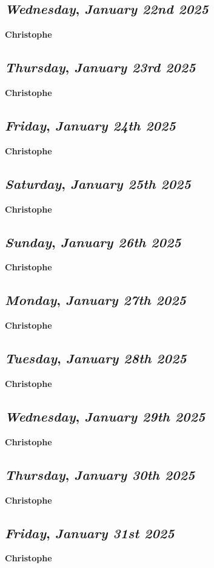 \def\day{\textit{January 22nd 2025}}
\def\weekday{\textit{Wednesday}}
\subsection*{\weekday, \day}
\textbf {Christophe}

\def\day{\textit{January 23rd 2025}}
\def\weekday{\textit{Thursday}}
\subsection*{\weekday, \day}
\textbf {Christophe}

\def\day{\textit{January 24th 2025}}
\def\weekday{\textit{Friday}}
\subsection*{\weekday, \day}
\textbf {Christophe}

\def\day{\textit{January 25th 2025}}
\def\weekday{\textit{Saturday}}
\subsection*{\weekday, \day}
\textbf {Christophe}

\def\day{\textit{January 26th 2025}}
\def\weekday{\textit{Sunday}}
\subsection*{\weekday, \day}
\textbf {Christophe}

\def\day{\textit{January 27th 2025}}
\def\weekday{\textit{Monday}}
\subsection*{\weekday, \day}
\textbf {Christophe}

\def\day{\textit{January 28th 2025}}
\def\weekday{\textit{Tuesday}}
\subsection*{\weekday, \day}
\textbf {Christophe}

\def\day{\textit{January 29th 2025}}
\def\weekday{\textit{Wednesday}}
\subsection*{\weekday, \day}
\textbf {Christophe}

\def\day{\textit{January 30th 2025}}
\def\weekday{\textit{Thursday}}
\subsection*{\weekday, \day}
\textbf {Christophe}

\def\day{\textit{January 31st 2025}}
\def\weekday{\textit{Friday}}
\subsection*{\weekday, \day}
\textbf {Christophe}
